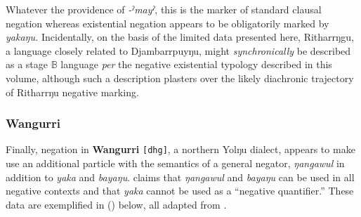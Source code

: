  Whatever the providence of \textit{-ˀmayˀ}, this is the marker of standard clausal negation whereas existential negation appears to be obligatorily marked by \textit{yakaŋu.} Incidentally, on the basis of the limited data presented here, Ritharrŋgu, a language closely related to Djambarrpuyŋu, might \textit{synchronically} be described as a stage $\mathbb B$ language \textit{per} the negative existential typology described in this volume, although such a description plasters over the likely diachronic trajectory of Ritharrŋu negative marking.



\subsubsection{Wangurri}

Finally, negation in \textbf{Wangurri} {\tt[dhg]}, a northern Yolŋu dialect, appears to make use an additional particle with the semantics of a general negator, \textit{ŋangawul} in addition to \textit{yaka} and \textit{bayaŋu}. \citet[195]{McLellan1992} claims that \textit{ŋangawul} and \textit{bayaŋu} can be used in all negative contexts and that \textit{yaka} cannot be used as a ``negative quantifier.'' These data are exemplified in (\nextx) below, all adapted from \citet{McLellan1992}.

